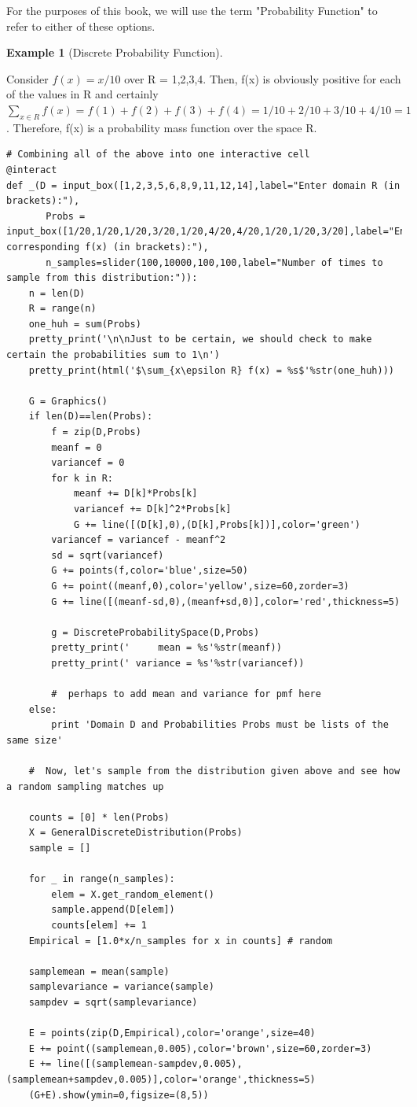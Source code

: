 \documentclass[10pt,]{book}
\theoremstyle{plain}
\theoremstyle{definition}
\theoremstyle{definition}
\newtheorem{example}[theorem]{Example}
\theoremstyle{definition}
\numberwithin{equation}{section}
\begin{document}
	For the purposes of this book, we will use the term "Probability Function" to refer to either of these options.
\begin{example}[Discrete Probability Function]\label{example-13}

	Consider \(f(x) = x/10\) over R = {1,2,3,4}.  Then, f(x) is obviously positive for each of the values in R and certainly \(\sum_{x \in R} f(x) = f(1) + f(2) + f(3) + f(4) = 1/10 + 2/10 + 3/10 + 4/10 = 1\). Therefore, f(x) is a probability mass function over the space R.
\end{example}
\begin{lstlisting}[style=sageinput]
# Combining all of the above into one interactive cell
@interact
def _(D = input_box([1,2,3,5,6,8,9,11,12,14],label="Enter domain R (in brackets):"), 
       Probs = input_box([1/20,1/20,1/20,3/20,1/20,4/20,4/20,1/20,1/20,3/20],label="Enter corresponding f(x) (in brackets):"),
       n_samples=slider(100,10000,100,100,label="Number of times to sample from this distribution:")):
    n = len(D)
    R = range(n)
    one_huh = sum(Probs)
    pretty_print('\n\nJust to be certain, we should check to make certain the probabilities sum to 1\n')
    pretty_print(html('$\sum_{x\epsilon R} f(x) = %s$'%str(one_huh)))
    
    G = Graphics()
    if len(D)==len(Probs):
        f = zip(D,Probs)
        meanf = 0
        variancef = 0
        for k in R:
            meanf += D[k]*Probs[k]
            variancef += D[k]^2*Probs[k]
            G += line([(D[k],0),(D[k],Probs[k])],color='green')
        variancef = variancef - meanf^2
        sd = sqrt(variancef)
        G += points(f,color='blue',size=50)
        G += point((meanf,0),color='yellow',size=60,zorder=3)
        G += line([(meanf-sd,0),(meanf+sd,0)],color='red',thickness=5)
    
        g = DiscreteProbabilitySpace(D,Probs)
        pretty_print('     mean = %s'%str(meanf))
        pretty_print(' variance = %s'%str(variancef))
    
        #  perhaps to add mean and variance for pmf here
    else:
        print 'Domain D and Probabilities Probs must be lists of the same size'
    
    #  Now, let's sample from the distribution given above and see how a random sampling matches up

    counts = [0] * len(Probs)
    X = GeneralDiscreteDistribution(Probs)
    sample = []

    for _ in range(n_samples):
        elem = X.get_random_element()
        sample.append(D[elem])
        counts[elem] += 1
    Empirical = [1.0*x/n_samples for x in counts] # random
    
    samplemean = mean(sample)
    samplevariance = variance(sample)
    sampdev = sqrt(samplevariance)
    
    E = points(zip(D,Empirical),color='orange',size=40)
    E += point((samplemean,0.005),color='brown',size=60,zorder=3)
    E += line([(samplemean-sampdev,0.005),(samplemean+sampdev,0.005)],color='orange',thickness=5)    
    (G+E).show(ymin=0,figsize=(8,5))
\end{lstlisting}
\end{document}
